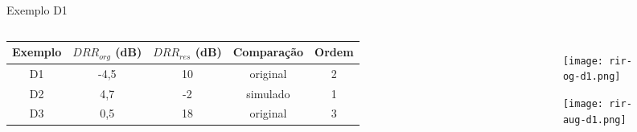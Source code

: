 \begin{frame}{Exemplo D1}
    \begin{columns}

        \begin{table} [H]
            \begin{adjustbox}{width=\columnwidth,center}
                \begin{tabular}{c|c|c|c|c}
            
                    \textbf{Exemplo} & 
                    \textbf{$DRR_{org}$ (dB)} & 
                    \textbf{$DRR_{res}$ (dB)} & 
                    \textbf{Comparação} &
                    \textbf{Ordem} \\
                    \hline 
            
                    D1 & -4,5 & 10 & original & 2 \\
                    D2 & 4,7 & -2 & simulado & 1 \\
                    D3 & 0,5 & 18 & original & 3 \\
            
                \end{tabular}
            \end{adjustbox}
        \end{table}

        \begin{figure}
            \begin{subfigure}{\textwidth}
                \centering
                \texttt{[image: rir-og-d1.png]}
            \end{subfigure}
            \begin{subfigure}{\textwidth}
                \centering
                \texttt{[image: rir-aug-d1.png]}
            \end{subfigure}
        \end{figure}
    \end{columns}
        
\end{frame}

